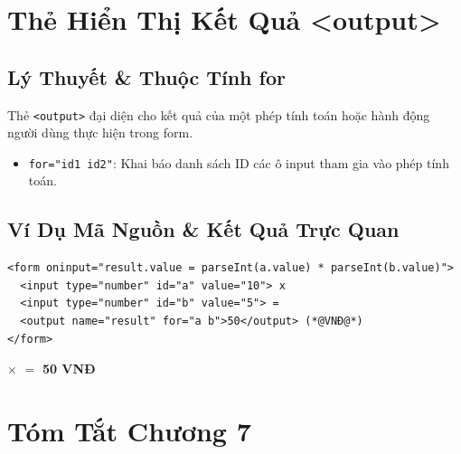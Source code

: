 \documentclass[11pt,oneside]{book}
\newcommand{\codeinline}[1]{\textcolor{accentOrange}{\texttt{#1}}}
\begin{document}
\section{Thẻ Hiển Thị Kết Quả <output>}
\subsection{Lý Thuyết \& Thuộc Tính for}

Thẻ \codeinline{<output>} đại diện cho kết quả của một phép tính toán hoặc hành động người dùng thực hiện trong form.

\begin{conceptBox}
\begin{itemize}[leftmargin=1.5em, itemsep=3pt, parsep=0pt]
    \item \codeinline{for="id1 id2"}: Khai báo danh sách ID các ô input tham gia vào phép tính toán.
\end{itemize}
\end{conceptBox}

\subsection{Ví Dụ Mã Nguồn \& Kết Quả Trực Quan}

\begin{codeWindow}
\begin{lstlisting}[language=HTML5]
<form oninput="result.value = parseInt(a.value) * parseInt(b.value)">
  <input type="number" id="a" value="10"> x
  <input type="number" id="b" value="5"> =
  <output name="result" for="a b">50</output> (*@VNĐ@*)
</form>
\end{lstlisting}
\end{codeWindow}

\begin{browserWindow}
\sffamily\small
\begin{center}
 $\times$  $=$ \textcolor{green!60!black}{\textbf{50 VNĐ}}
\end{center}
\end{browserWindow}

\section{Tóm Tắt Chương 7}
\end{document}
